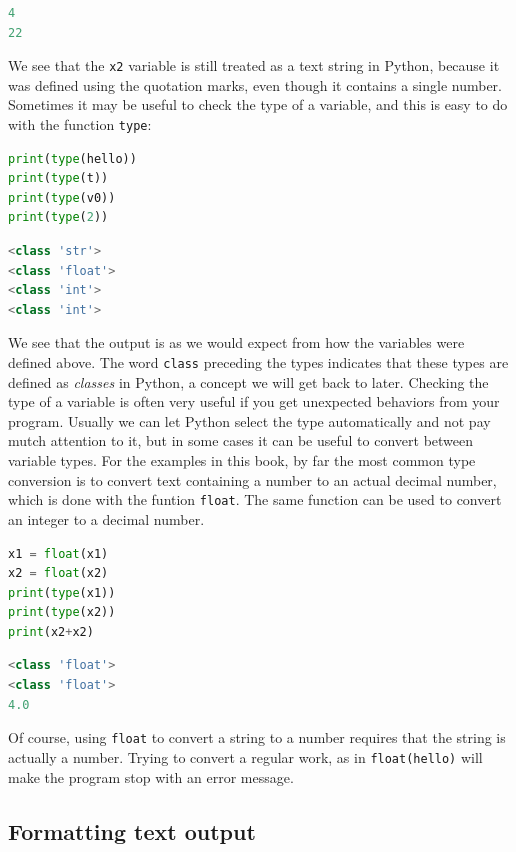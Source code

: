 \documentclass[graybox,envcountchap,sectrefs,final]{svmonodo}
\begin{document}
\begin{lstlisting}[language=Python,style=gray]
4
22
\end{lstlisting}
We see that the \texttt{x2} variable is still treated as a text string in Python, because it was defined using the
quotation marks, even though it contains a single number. Sometimes it may be useful to check the type of a variable,
and this is easy to do with the function \texttt{type}:
\begin{lstlisting}[language=Python,style=blue1]
print(type(hello))
print(type(t))
print(type(v0))
print(type(2))
\end{lstlisting}
\begin{lstlisting}[language=Python,style=gray]
<class 'str'>
<class 'float'>
<class 'int'>
<class 'int'>
\end{lstlisting}
We see that the output is as we would expect from how the variables were defined above. The word \texttt{class} preceding the types
indicates that these types are defined as \emph{classes} in Python, a concept we will get back to later. Checking the type of a variable is
often very useful if you get unexpected behaviors from your program. Usually we can let Python select the type
automatically and not pay mutch attention to it, but in some cases it can be useful to convert between variable types.
For the examples in this book, by far the most common type conversion is to convert text containing a number to an
actual decimal number, which is done with the funtion \texttt{float}. The same function can be used to convert an integer to a decimal number.
\begin{lstlisting}[language=Python,style=blue1]
x1 = float(x1)
x2 = float(x2)
print(type(x1))
print(type(x2))
print(x2+x2)
\end{lstlisting}
\begin{lstlisting}[language=Python,style=gray]
<class 'float'>
<class 'float'>
4.0
\end{lstlisting}
Of course, using \texttt{float} to convert a string to a number requires that the string is actually a number. Trying to convert
a regular work, as in \texttt{float(hello)} will make the program stop with an error message.

\subsection{Formatting text output}
\end{document}
